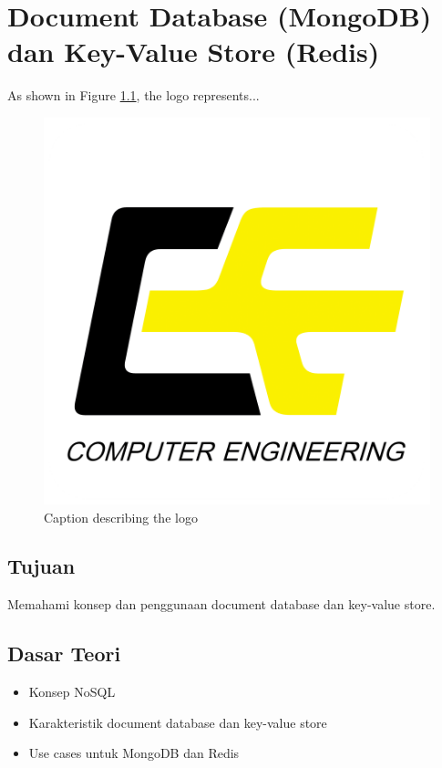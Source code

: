 \chapter{Document Database (MongoDB) dan Key-Value Store (Redis)}

As shown in Figure \ref{fig:ce-logo}, the logo represents...

\begin{figure}[h]
    \begin{center}
        \includegraphics[scale=0.035]{./ce-logo}
        \caption{Caption describing the logo}
        \label{fig:ce-logo}
    \end{center}
\end{figure}

\section{Tujuan}
Memahami konsep dan penggunaan document database dan key-value store.

\section{Dasar Teori}
\begin{itemize}
    \item Konsep NoSQL
    \item Karakteristik document database dan key-value store
    \item Use cases untuk MongoDB dan Redis
\end{itemize}

